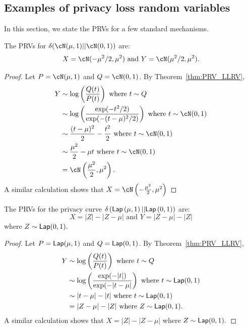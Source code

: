 \subsection{Examples of privacy loss random variables}
In this section, we state the PRVs for a few standard mechanisms. 

\begin{proposition}
The PRVs for $\delta(\cN(\mu,1)||\cN(0,1))$ are:
$$X=\cN(-\mu^2/2,\mu^2) \text{ and } Y=\cN(\mu^2/2,\mu^2).$$
\end{proposition}
\begin{proof}
	Let $P=\cN(\mu,1)$ and $Q=\cN(0,1)$.
	By Theorem~\ref{thm:PRV_LLRV},
	\begin{align*}
		Y &\sim \log\lp \frac{Q(t)}{P(t)}\rp \text{ where } t\sim Q\\
		&\sim \log\lp \frac{\exp(-t^2/2)}{\exp(-(t-\mu)^2/2)}\rp \text{ where } t\sim \cN(0,1)\\
		&\sim \frac{(t-\mu)^2}{2} - \frac{t^2}{2} \text{ where } t\sim \cN(0,1)\\
		&\sim \frac{\mu^2}{2}-\mu t \text{ where } t\sim \cN(0,1)\\
		&= \cN\lp \frac{\mu^2}{2},\mu^2 \rp.
	\end{align*}
	A similar calculation shows that $X=\cN\lp -\frac{\mu^2}{2},\mu^2\rp$
\end{proof}




\begin{proposition}
	The PRVs for the privacy curve $\delta\left(\mathsf{Lap}\left( \mu,1\right)||\mathsf{Lap}\left( 0,1\right)\right)$ are:
	$$X=|Z|-|Z-\mu| \text{ and } Y= |Z-\mu|-|Z|$$ where $Z\sim \mathsf{Lap}(0,1).$
\end{proposition}
\begin{proof}
	Let $P=\mathsf{Lap}(\mu,1)$ and $Q=\mathsf{Lap}(0,1)$.
	By Theorem~\ref{thm:PRV_LLRV},
	\begin{align*}
		Y &\sim \log\left( \frac{Q(t)}{P(t)}\right) \text{ where } t\sim Q\\
		&\sim \log\left( \frac{\exp(-|t|)}{\exp(-|t-\mu|}\right) \text{ where } t\sim \mathsf{Lap}(0,1)\\
		&\sim |t-\mu|-|t| \text{ where } t\sim \mathsf{Lap}(0,1)\\
		&= |Z-\mu|-|Z| \text{ where } Z\sim \mathsf{Lap}(0,1).
	\end{align*}
	A similar calculation shows that $X=|Z|-|Z-\mu|$ where $Z\sim\mathsf{Lap}(0,1).$
\end{proof}

